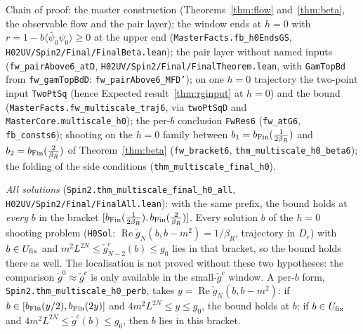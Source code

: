 \documentclass[11pt]{amsart}
\theoremstyle{definition}
\theoremstyle{remark}
\numberwithin{equation}{section}
\newcommand{\avg}[1]{\langle #1\rangle}
\begin{document}
Chain of proof: the master construction (Theorems~\ref{thm:flow} and~\ref{thm:beta}, the observable flow and the pair layer);
the window ends at $h=0$ with $r=1-b\avg{\bar\psi_0\psi_0}\ge0$ at the upper end (\texttt{MasterFacts.fb\_h0EndsGS},
\texttt{H02UV/Spin2/Final/FinalBeta.lean}); the pair layer without named inputs (\texttt{fw\_pairAbove6\_atD}, \texttt{H02UV/Spin2/Final/FinalTheorem.lean},
with \texttt{GamTopBd} from \texttt{fw\_gamTopBdD}: \texttt{fw\_pairAbove6\_MFD'}); on one $h=0$ trajectory the two-point input
\texttt{TwoPtSq} (hence Expected result~\ref{thm:rginput} at $h=0$) and the bound (\texttt{MasterFacts.fw\_multiscale\_traj6}, via
\texttt{twoPtSqD} and \texttt{MasterCore.multiscale\_h0}); the per-$b$ conclusion \texttt{FwRes6} (\texttt{fw\_atG6}, \texttt{fb\_consts6});
shooting on the $h=0$ family between $b_1=b_{\rm Fin}(\frac1{2\beta_R})$ and $b_2=b_{\rm Fin}(\frac2{\beta_R})$ of Theorem~\ref{thm:beta}
(\texttt{fw\_bracket6}, \texttt{thm\_multiscale\_h0\_beta6}); the folding of the side conditions (\texttt{thm\_multiscale\_final\_h0}).

\emph{All solutions} (\texttt{Spin2.thm\_multiscale\_final\_h0\_all}, \texttt{H02UV/Spin2/Final/FinalAll.lean}): with the same prefix, the
bound holds at \emph{every} $b$ in the bracket $[b_{\rm Fin}(\frac1{2\beta_R}),b_{\rm Fin}(\frac2{\beta_R})]$. Every solution $b$ of the
$h=0$ shooting problem (\texttt{H0Sol}: $\operatorname{Re}\check g_N(b,b-m^2)=1/\beta_R$, trajectory in $D_\varepsilon$) with
$b\in U_{\rm fix}$ and $m^2L^{2N}\le\check g^c_{N-2}(b)\le g_0$ lies in that bracket, so the bound holds there as well. The
localisation is not proved without these two hypotheses: the comparison $\check g^0\approx\check g^c$ is only available in the
small-$\check g^c$ window. A per-$b$ form, \texttt{Spin2.thm\_multiscale\_h0\_perb}, takes $y=\operatorname{Re}\check g_N(b,b-m^2)$:
if $b\in[b_{\rm Fin}(y/2),b_{\rm Fin}(2y)]$ and $4m^2L^{2N}\le y\le g_0$, the bound holds at $b$; if $b\in U_{\rm fix}$ and
$4m^2L^{2N}\le\check g^c(b)\le g_0$, then $b$ lies in this bracket.
\end{document}
